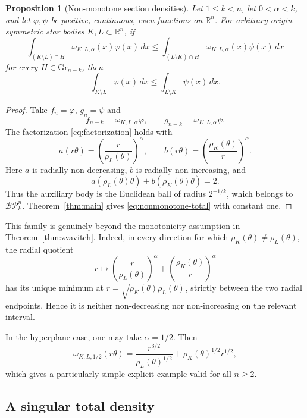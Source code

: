 \documentclass{amsart}
\newtheorem{proposition}[theorem]{Proposition}
\theoremstyle{remark}
\newcommand{\R}{\mathbb{R}}
\newcommand{\BP}{\mathcal{BP}}
\newcommand{\Gr}{\mathrm{Gr}}
\newcommand{\dd}{\,d}
\begin{document}
\begin{proposition}[Non-monotone section densities]
\label{prop:nonmonotone}
Let $1\leq k<n$, let $0<\alpha<k$, and let $\varphi,\psi$ be positive,
continuous, even functions on $\R^n$. For
arbitrary origin-symmetric star bodies $K,L\subset\R^n$, if
\begin{equation}\label{eq:nonmonotone-sections}
 \int_{(K\setminus L)\cap H}
     \omega_{K,L,\alpha}(x)\varphi(x)\dd x
 \leq
 \int_{(L\setminus K)\cap H}
     \omega_{K,L,\alpha}(x)\psi(x)\dd x
\end{equation}
for every $H\in\Gr_{n-k}$, then
\begin{equation}\label{eq:nonmonotone-total}
 \int_{K\setminus L}\varphi(x)\dd x
 \leq
 \int_{L\setminus K}\psi(x)\dd x.
\end{equation}
\end{proposition}

\begin{proof}
Take $f_n=\varphi$, $g_n=\psi$ and
\[
 f_{n-k}=\omega_{K,L,\alpha}\varphi,
 \qquad
 g_{n-k}=\omega_{K,L,\alpha}\psi.
\]
The factorization \eqref{eq:factorization} holds with
\[
 a(r\theta)=\left(\frac{r}{\rho_L(\theta)}\right)^\alpha,
 \qquad
 b(r\theta)=\left(\frac{\rho_K(\theta)}{r}\right)^\alpha.
\]
Here $a$ is radially non-decreasing, $b$ is radially non-increasing, and
\[
 a(\rho_L(\theta)\theta)
 +b(\rho_K(\theta)\theta)=2.
\]
Thus the auxiliary body is the Euclidean ball of radius $2^{-1/k}$, which
belongs to $\BP_k^n$. Theorem~\ref{thm:main} gives
\eqref{eq:nonmonotone-total} with constant one.
\end{proof}

This family is genuinely beyond the monotonicity assumption in
Theorem~\ref{thm:zvavitch}. Indeed, in every direction for which
$\rho_K(\theta)\neq\rho_L(\theta)$, the radial quotient
\[
 r\longmapsto
 \left(\frac{r}{\rho_L(\theta)}\right)^\alpha
 +\left(\frac{\rho_K(\theta)}{r}\right)^\alpha
\]
has its unique minimum at
$r=\sqrt{\rho_K(\theta)\rho_L(\theta)}$, strictly between the two radial
endpoints. Hence it is neither non-decreasing nor non-increasing on the
relevant interval.

In the hyperplane case, one may take $\alpha=1/2$. Then
\[
 \omega_{K,L,1/2}(r\theta)
 =\frac{r^{3/2}}{\rho_L(\theta)^{1/2}}
  +\rho_K(\theta)^{1/2}r^{1/2},
\]
which gives a particularly simple explicit example valid for all $n\geq2$.

\subsection{A singular total density}
\end{document}
